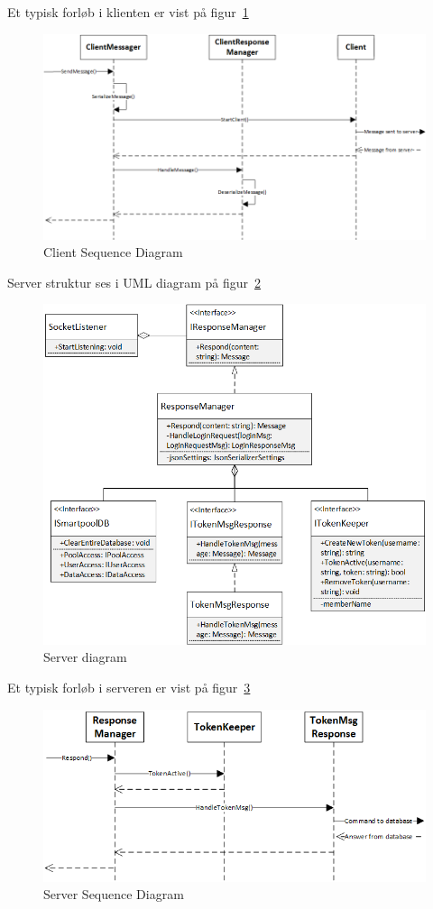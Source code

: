 Et typisk forløb i klienten er vist på figur~\ref{fig:ClientSequence}
\begin{figure}
	\centering
	\includegraphics[width=0.9\linewidth]{figs/connection/ClientSequence.png}
	\caption{Client Sequence Diagram}
	\label{fig:ClientSequence}
\end{figure}

Server struktur ses i UML diagram på figur~\ref{fig:ConnectionServer}
\begin{figure}
	\centering
	\includegraphics[width=0.9\linewidth]{figs/connection/ConnectionServer.png}
	\caption{Server diagram}
	\label{fig:ConnectionServer}
\end{figure}

Et typisk forløb i serveren er vist på figur~\ref{fig:ServerSequenceResponse}
\begin{figure}
	\centering
	\includegraphics[width=0.9\linewidth]{figs/connection/ServerSequenceResponse.png}
	\caption{Server Sequence Diagram}
	\label{fig:ServerSequenceResponse}
\end{figure}

